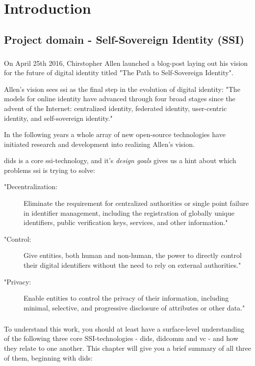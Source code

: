 \chapter{Introduction}



\section{Project domain - Self-Sovereign Identity (SSI)}

\paragraph{}
On April 25th 2016, Chirstopher Allen launched a blog-post laying out his vision for the future of digital identity titled "The Path to Self-Sovereign Identity"\cite{ThePathToSelfSovereignIdentity}. 

Allen's vision sees \acrfull{ssi} as the final step in the evolution of digital identity: "The models for online identity have advanced through four broad stages since the advent of the Internet: centralized identity, federated identity, user-centric identity, and self-sovereign identity."\cite{ThePathToSelfSovereignIdentity}

In the following years a whole array of new open-source technologies have initiated research and development into realizing Allen's vision. 

\acrfull{dids} is a core \acrshort{ssi}-technology, and it's \textit{design goals}\cite{DIDDesignGoals} gives us a hint about which problems \acrshort{ssi} is trying to solve:
\begin{description}
    \item["Decentralization:] Eliminate the requirement for centralized authorities or single point failure in identifier management, including the registration of globally unique identifiers, public verification keys, services, and other information."
    \item["Control:] Give entities, both human and non-human, the power to directly control their digital identifiers without the need to rely on external authorities."
    \item ["Privacy:] Enable entities to control the privacy of their information, including minimal, selective, and progressive disclosure of attributes or other data."
\end{description}

\paragraph{}
To understand this work, you should at least have a surface-level understanding of the following three core SSI-technologies - \acrfull{dids}, \acrfull{didcomm} and \acrfull{vc} - and how they relate to one another. This chapter will give you a brief summary of all three of them, beginning with \acrshort{dids}:

